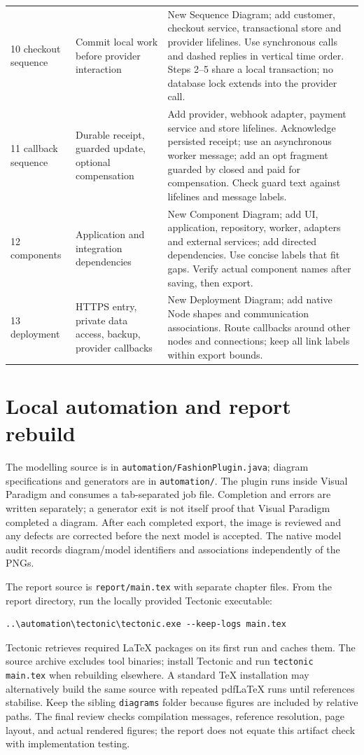 \begin{longtable}{P{.15\linewidth}P{.3\linewidth}P{.43\linewidth}}
10 checkout sequence & Commit local work before provider interaction & New Sequence Diagram; add customer, checkout service, transactional store and provider lifelines. Use synchronous calls and dashed replies in vertical time order. Steps 2--5 share a local transaction; no database lock extends into the provider call.\\
11 callback sequence & Durable receipt, guarded update, optional compensation & Add provider, webhook adapter, payment service and store lifelines. Acknowledge persisted receipt; use an asynchronous worker message; add an opt fragment guarded by closed and paid for compensation. Check guard text against lifelines and message labels.\\
12 components & Application and integration dependencies & New Component Diagram; add UI, application, repository, worker, adapters and external services; add directed dependencies. Use concise labels that fit gaps. Verify actual component names after saving, then export.\\
13 deployment & HTTPS entry, private data access, backup, provider callbacks & New Deployment Diagram; add native Node shapes and communication associations. Route callbacks around other nodes and connections; keep all link labels within export bounds.\\
\bottomrule
\end{longtable}

\section{Local automation and report rebuild}
The modelling source is in \texttt{automation/FashionPlugin.java}; diagram specifications and generators are in \texttt{automation/}. The plugin runs inside Visual Paradigm and consumes a tab-separated job file. Completion and errors are written separately; a generator exit is not itself proof that Visual Paradigm completed a diagram. After each completed export, the image is reviewed and any defects are corrected before the next model is accepted. The native model audit records diagram/model identifiers and associations independently of the PNGs.

The report source is \texttt{report/main.tex} with separate chapter files. From the report directory, run the locally provided Tectonic executable:
\begin{verbatim}
..\automation\tectonic\tectonic.exe --keep-logs main.tex
\end{verbatim}
Tectonic retrieves required LaTeX packages on its first run and caches them. The source archive excludes tool binaries; install Tectonic and run \texttt{tectonic main.tex} when rebuilding elsewhere. A standard TeX installation may alternatively build the same source with repeated pdfLaTeX runs until references stabilise. Keep the sibling \texttt{diagrams} folder because figures are included by relative paths. The final review checks compilation messages, reference resolution, page layout, and actual rendered figures; the report does not equate this artifact check with implementation testing.

